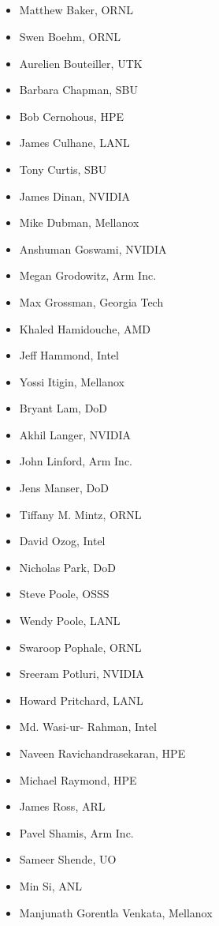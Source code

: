 \subsection*{}
\begin{multicols}{2}
\begin{itemize}
\setlength\itemsep{0.1em}
\item Matthew Baker, \ac{ORNL}
\item Swen Boehm, \ac{ORNL}
\item Aurelien Bouteiller, \ac{UTK}
\item Barbara Chapman, \ac{SBU}
\item Bob Cernohous, \ac{HPE}
\item James Culhane, \ac{LANL}
\item Tony Curtis, \ac{SBU}
\item James Dinan\footnotemark[1] \footnotemark[2], NVIDIA
\item Mike Dubman, Mellanox
\item Anshuman Goswami, NVIDIA
\item Megan Grodowitz, Arm Inc.
\item Max Grossman, Georgia Tech
\item Khaled Hamidouche, \ac{AMD}
\item Jeff Hammond, Intel
\item Yossi Itigin, Mellanox
\item Bryant Lam\footnotemark[3], \ac{DoD}
\item Akhil Langer, NVIDIA
\item John Linford\footnotemark[4], Arm Inc.
\item Jens Manser, \ac{DoD}
\item Tiffany M. Mintz, \ac{ORNL}
\item David Ozog, Intel
\item Nicholas Park\footnotemark[5], \ac{DoD}
\item Steve Poole\footnotemark[6], \ac{OSSS}
\item Wendy Poole, \ac{LANL}
\item Swaroop Pophale, \ac{ORNL}
\item Sreeram Potluri, NVIDIA
\item Howard Pritchard, \ac{LANL}
\item Md. Wasi-ur- Rahman\footnotemark[4], Intel
\item Naveen Ravichandrasekaran\footnotemark[7], \ac{HPE}
\item Michael Raymond\footnotemark[8], \ac{HPE}
\item James Ross, \ac{ARL}
\item Pavel Shamis\footnotemark[9], Arm Inc.
\item Sameer Shende, \ac{UO}
\item Min Si, \ac{ANL}
\item Manjunath Gorentla Venkata\footnotemark[10] \footnotemark[11], Mellanox
\end{itemize}
\end{multicols}

